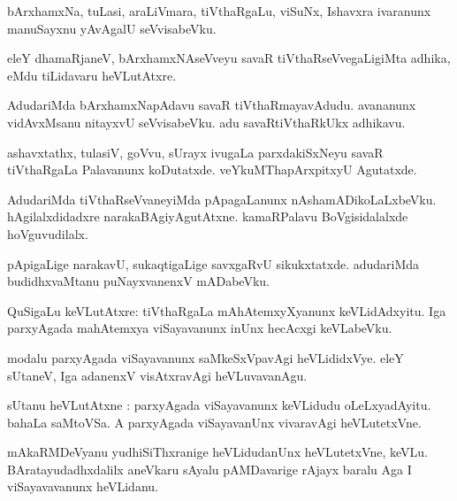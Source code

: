 \documentclass{article}
\begin{document}
\begin{mn}
bArxhamxNa, tuLasi, araLiVmara, tiVthaRgaLu, viSuNx, Ishavxra ivaranunx manuSayxnu yAvAgalU 
seVvisabeVku.
\end{mn}

\begin{mn}
eleY dhamaRjaneV, bArxhamxNAseVveyu savaR tiVthaRseVvegaLigiMta adhika, eMdu tiLidavaru heVLutAtxre.
\end{mn}


\begin{mn}
AdudariMda bArxhamxNapAdavu savaR tiVthaRmayavAdudu. avananunx vidAvxMsanu nitayxvU seVvisabeVku. adu 
savaRtiVthaRkUkx adhikavu.
\end{mn}


\begin{mn}
ashavxtathx, tulasiV, goVvu, sUrayx ivugaLa parxdakiSxNeyu savaR tiVthaRgaLa Palavanunx koDutatxde. 
veYkuMThapArxpitxyU Agutatxde.
\end{mn}

\begin{mn}
AdudariMda tiVthaRseVvaneyiMda pApagaLanunx nAshamADikoLaLxbeVku. hAgilalxdidadxre narakaBAgiyAgutAtxne.
kamaRPalavu BoVgisidalalxde hoVguvudilalx.
\end{mn}

\begin{mn}
pApigaLige narakavU, sukaqtigaLige savxgaRvU sikukxtatxde. adudariMda budidhxvaMtanu
puNayxvanenxV mADabeVku.
\end{mn}

\begin{mn}
QuSigaLu keVLutAtxre: tiVthaRgaLa mAhAtemxyXyanunx keVLidAdxyitu. Iga parxyAgada mahAtemxya 
viSayavanunx inUnx hecAcxgi keVLabeVku.
\end{mn}

\begin{mn}
modalu parxyAgada viSayavanunx saMkeSxVpavAgi heVLididxVye. eleY sUtaneV, Iga adanenxV 
visAtxravAgi heVLuvavanAgu.
\end{mn}

\begin{mn}
sUtanu heVLutAtxne : parxyAgada viSayavanunx keVLidudu oLeLxyadAyitu. bahaLa saMtoVSa. A parxyAgada 
viSayavanUnx vivaravAgi heVLutetxVne.
\end{mn}

\begin{mn}
mAkaRMDeVyanu yudhiSiThxranige heVLidudanUnx heVLutetxVne, keVLu. BAratayudadhxdalilx aneVkaru 
sAyalu pAMDavarige rAjayx baralu Aga I viSayavavanunx heVLidanu.
\end{mn}
\end{document}
